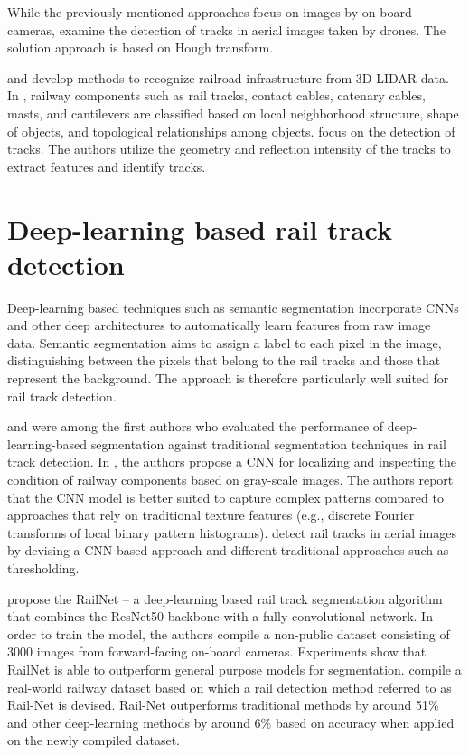 \documentclass[Master,MDS,english]{BASE/twbook} %
\begin{document}
While the previously mentioned approaches focus on images by on-board cameras, \cite{7952544} examine the detection of tracks in aerial images taken by drones. The solution approach is based on Hough transform.

\cite{rs71114916} and \cite{6783695} develop methods to recognize railroad infrastructure from 3D LIDAR data.
In \cite{rs71114916}, railway components such as rail tracks, contact cables, catenary cables, masts, and cantilevers are classified based on local neighborhood structure, shape of objects, and topological relationships among objects. 
\cite{6783695} focus on the detection of tracks. The authors utilize the geometry and reflection intensity of the tracks to
extract features and identify tracks.


\section{Deep-learning based rail track detection}

Deep-learning based techniques such as semantic segmentation incorporate CNNs and other deep architectures to automatically learn features from raw image data. Semantic segmentation aims to assign a label to each pixel in the image, distinguishing between the pixels that belong to the rail tracks and those that represent the background. The approach is therefore particularly well suited for rail track detection. 

\cite{7350873} and \cite{8517865} were among the first authors who evaluated the performance of deep-learning-based segmentation against traditional segmentation techniques in rail track detection. 
In \cite{7350873}, the authors propose a CNN for localizing and inspecting the condition of railway components based on gray-scale images. The authors report that the CNN model is better suited to capture complex patterns compared to approaches that rely on traditional texture features (e.g., discrete Fourier transforms of local binary pattern histograms). 
\cite{8517865} detect rail tracks in aerial images by devising a CNN based approach and different traditional approaches such as thresholding. 

\cite{8859360} propose the RailNet -- a deep-learning based rail track segmentation algorithm that combines the ResNet50 backbone with a fully convolutional network. In order to train the model, the authors compile a non-public dataset consisting of 3000 images from forward-facing on-board cameras. Experiments show that RailNet is able to outperform general purpose models for segmentation.
\cite{10.1145/3503161.3548050} compile a real-world railway dataset based on which a rail detection method referred to as Rail-Net is devised. Rail-Net outperforms traditional methods by around 51\% and other deep-learning methods by around 6\% based on accuracy when applied on the newly compiled dataset. 
\end{document}
